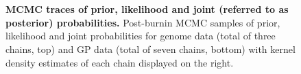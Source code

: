\documentclass[11pt,oneside,letterpaper]{article}
\begin{document}
\begin{figure}[h]
 \centering
  \\
  \\
  \caption{\textbf{MCMC traces of prior, likelihood and joint (referred to as posterior) probabilities.}
  Post-burnin MCMC samples of prior, likelihood and joint probabilities for genome data (total of three chains, top) and GP data (total of seven chains, bottom) with kernel density estimates of each chain displayed on the right.
  }
	\label{mcmc}
\end{figure}
\end{document}
